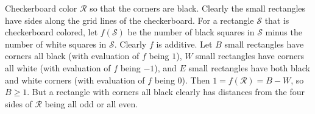 Checkerboard color $\mathcal{R}$ so that the corners are black. Clearly the small rectangles have sides along the grid lines of the checkerboard. For a rectangle $\mathcal{S}$ that is checkerboard colored, let $f\left(\mathcal{S}\right)$ be the number of black squares in $\mathcal{S}$ minus the number of white squares in $\mathcal{S}$. Clearly $f$ is additive. Let $B$ small rectangles have corners all black (with evaluation of $f$ being $1$), $W$ small rectangles have corners all white (with evaluation of $f$ being $-1$), and $E$ small rectangles have both black and white corners (with evaluation of $f$ being $0$). Then $1=f\left(\mathcal{R}\right)=B-W$, so $B\geq1$. But a rectangle with corners all black clearly has distances from the four sides of $\mathcal{R}$ being all odd or all even.